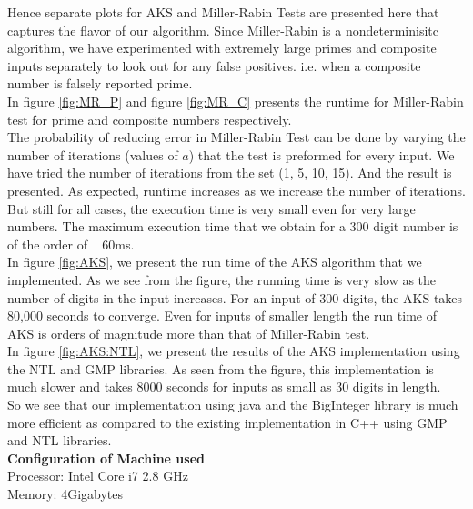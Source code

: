 \documentclass[paper=a4, fontsize=11pt]{scrartcl}	%
\numberwithin{equation}{section}		%
\numberwithin{figure}{section}		%
\numberwithin{table}{section}		%
\begin{document}
Hence separate plots for AKS and Miller-Rabin Tests are presented here that captures the flavor of our algorithm. 
Since Miller-Rabin is a nondeterminisitc algorithm, we have experimented with extremely large primes and composite inputs separately to look out for any false positives. i.e. when a composite number is falsely reported prime. \\

In figure \ref{fig:MR_P} and figure \ref{fig:MR_C} presents the runtime for Miller-Rabin test for prime and composite numbers respectively. \\

The probability of reducing error in Miller-Rabin Test can be done by varying the number of iterations (values of $a$) that the test is preformed for every input. We have tried the number of iterations from the set (1, 5, 10, 15). And the result is presented. As expected, runtime increases as we increase the number of iterations. But still for all cases, the execution time is very small even for very large numbers. The maximum execution time that we obtain for a 300 digit number is of the order of ~ 60ms.\\

In figure \ref{fig:AKS}, we present the run time of the AKS algorithm that we implemented. As we see from the figure, the running time is very slow as the number of digits in the input increases. For an input of 300 digits, the AKS takes 80,000 seconds to converge. Even for inputs of smaller length the run time of AKS is orders of magnitude more than that of Miller-Rabin test. \\

In figure \ref{fig:AKS:NTL}, we present the results of the AKS implementation using the NTL and GMP libraries. As seen from the figure, this implementation is much slower and takes 8000 seconds for inputs as small as 30 digits in length. \\

So we see that our implementation using java and the BigInteger library is much more efficient as compared to the existing implementation in C++ using GMP and NTL libraries. \\

\textbf{Configuration of Machine used}\\
Processor: Intel Core i7 2.8 GHz\\
Memory: 4Gigabytes\\
\end{document}
